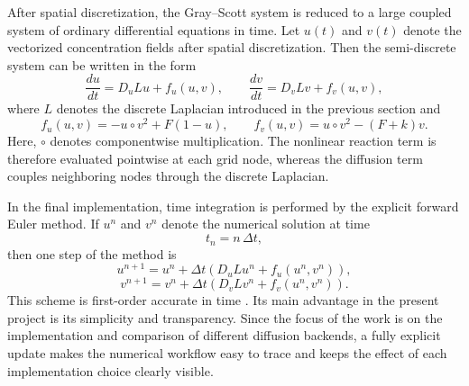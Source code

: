 After spatial discretization, the Gray--Scott system is reduced to a large coupled system of ordinary differential equations in time. Let $u(t)$ and $v(t)$ denote the vectorized concentration fields after spatial discretization. Then the semi-discrete system can be written in the form
\begin{equation}
\frac{d u}{d t} = D_u L u + f_u(u,v),
\qquad
\frac{d v}{d t} = D_v L v + f_v(u,v),
\label{eq:semi_discrete_gs_numimpl}
\end{equation}
where $L$ denotes the discrete Laplacian introduced in the previous section and
\begin{equation}
f_u(u,v) = -u \circ v^2 + F(1-u),
\qquad
f_v(u,v) = u \circ v^2 - (F+k)v.
\label{eq:reaction_vector_form_numimpl}
\end{equation}
Here, $\circ$ denotes componentwise multiplication. The nonlinear reaction term is therefore evaluated pointwise at each grid node, whereas the diffusion term couples neighboring nodes through the discrete Laplacian.

In the final implementation, time integration is performed by the explicit forward Euler method. If $u^n$ and $v^n$ denote the numerical solution at time
\[
t_n = n \,\Delta t,
\]
then one step of the method is
\begin{equation}
u^{n+1}
=
u^n + \Delta t \left(D_u L u^n + f_u(u^n,v^n)\right),
\label{eq:euler_u_numimpl}
\end{equation}
\begin{equation}
v^{n+1}
=
v^n + \Delta t \left(D_v L v^n + f_v(u^n,v^n)\right).
\label{eq:euler_v_numimpl}
\end{equation}
This scheme is first-order accurate in time \cite{leveque2007}. Its main advantage in the present project is its simplicity and transparency. Since the focus of the work is on the implementation and comparison of different diffusion backends, a fully explicit update makes the numerical workflow easy to trace and keeps the effect of each implementation choice clearly visible.

